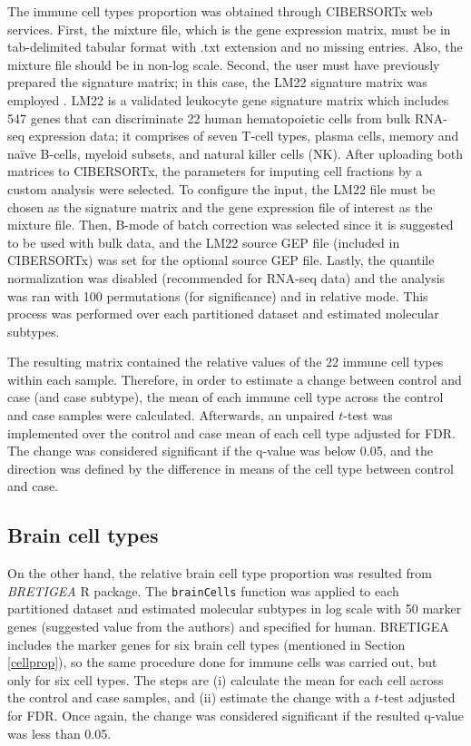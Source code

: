 The immune cell types proportion was obtained through CIBERSORTx web services. First, the mixture file, which is the gene expression matrix, must be in tab-delimited tabular format with .txt extension and no missing entries. Also, the mixture file should be in non-log scale. Second, the user must have previously prepared the signature matrix; in this case, the LM22 signature matrix was employed \cite{newman15}. LM22 is a validated leukocyte gene signature matrix which includes 547 genes that can discriminate 22 human hematopoietic cells from bulk RNA-seq expression data; it comprises of seven T-cell types, plasma cells, memory and naïve B-cells, myeloid subsets, and natural killer cells (NK). After uploading both matrices to CIBERSORTx, the parameters for imputing cell fractions by a custom analysis were selected. To configure the input, the LM22 file must be chosen as the signature matrix and the gene expression file of interest as the mixture file. Then, B-mode of batch correction was selected since it is suggested to be used with bulk data, and the LM22 source GEP file (included in CIBERSORTx) was set for the optional source GEP file. Lastly, the quantile normalization was disabled (recommended for RNA-seq data) and the analysis was ran with 100 permutations (for significance) and in relative mode. This process was performed over each partitioned dataset and estimated molecular subtypes.

The resulting matrix contained the relative values of the 22 immune cell types within each sample. Therefore, in order to estimate a change between control and case (and case subtype), the mean of each immune cell type across the control and case samples were calculated. Afterwards, an unpaired $t$-test was implemented over the control and case mean of each cell type adjusted for FDR. The change was considered significant if the q-value was below 0.05, and the direction was defined by the difference in means of the cell type between control and case.

\subsection{Brain cell types} \label{brain-method}

On the other hand, the relative brain cell type proportion was resulted from \textit{BRETIGEA} R package. The \verb|brainCells| function was applied to each partitioned dataset and estimated molecular subtypes in log scale with 50 marker genes (suggested value from the authors) and specified for human. BRETIGEA includes the marker genes for six brain cell types (mentioned in Section \ref{cellprop}), so the same procedure done for immune cells was carried out, but only for six cell types. The steps are (i) calculate the mean for each cell across the control and case samples, and (ii) estimate the change with a $t$-test adjusted for FDR. Once again, the change was considered significant if the resulted q-value was less than 0.05.

